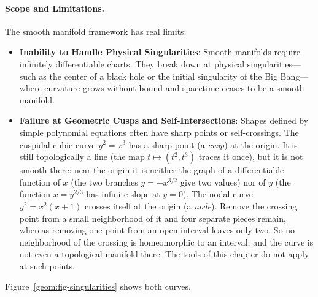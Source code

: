 \paragraph{Scope and Limitations.}
The smooth manifold framework has real limits:
\begin{itemize}
  \item \textbf{Inability to Handle Physical Singularities}: Smooth manifolds require infinitely differentiable charts. They break down at physical singularities---such as the center of a black hole or the initial singularity of the Big Bang---where curvature grows without bound and spacetime ceases to be a smooth manifold.
  \item \textbf{Failure at Geometric Cusps and Self-Intersections}: Shapes defined by simple polynomial equations often have sharp points or self-crossings. The cuspidal cubic curve $y^2 = x^3$ has a sharp point (a \emph{cusp}) at the origin. It is still topologically a line (the map $t \mapsto (t^2, t^3)$ traces it once), but it is not smooth there: near the origin it is neither the graph of a differentiable function of $x$ (the two branches $y = \pm x^{3/2}$ give two values) nor of $y$ (the function $x = y^{2/3}$ has infinite slope at $y = 0$). The nodal curve $y^2 = x^2(x+1)$ crosses itself at the origin (a \emph{node}). Remove the crossing point from a small neighborhood of it and four separate pieces remain, whereas removing one point from an open interval leaves only two. So no neighborhood of the crossing is homeomorphic to an interval, and the curve is not even a topological manifold there. The tools of this chapter do not apply at such points.
\end{itemize}

Figure~\ref{geom:fig-singularities} shows both curves.

